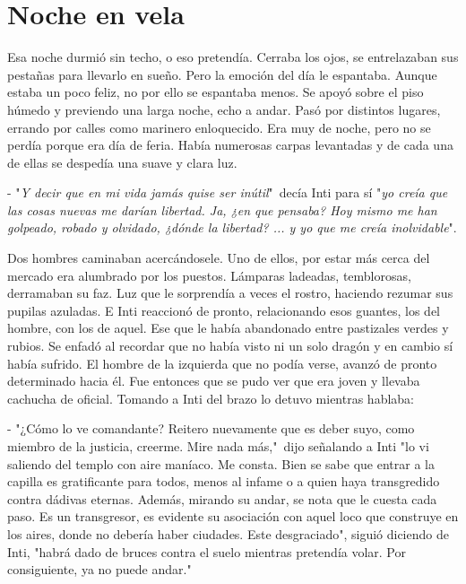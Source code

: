 
\chapter{Noche en vela}
Esa noche durmió sin techo, o eso pretendía. Cerraba los ojos, se entrelazaban sus pestañas para llevarlo en sueño. Pero la emoción del día le espantaba. Aunque estaba un poco feliz, no por ello se espantaba menos. Se apoyó sobre el piso húmedo y previendo una larga noche, echo a andar. Pasó por distintos lugares, errando por calles como marinero enloquecido. Era muy de noche, pero no se perdía porque era día de feria. Había numerosas carpas levantadas y de cada una de ellas se despedía una suave y clara luz.

- "\emph{Y decir que en mi vida jamás quise ser inútil}"\, decía Inti para sí "\emph{yo creía que las cosas nuevas me darían libertad. Ja, ¿en que pensaba? Hoy mismo me han golpeado, robado y olvidado, ¿dónde la libertad? ... y yo que me creía inolvidable}".

Dos hombres caminaban acercándosele. Uno de ellos, por estar más cerca del mercado era alumbrado por los puestos. Lámparas ladeadas, temblorosas, derramaban su faz. Luz que le sorprendía a veces el rostro, haciendo rezumar sus pupilas azuladas. E Inti reaccionó de pronto, relacionando esos guantes, los del hombre, con los de aquel. Ese que le había abandonado entre pastizales verdes y rubios. Se enfadó al recordar que no había visto ni un solo dragón y en cambio sí había sufrido. El hombre de la izquierda que no podía verse, avanzó de pronto determinado hacia él. Fue entonces que se pudo ver que era joven y llevaba cachucha de oficial. Tomando a Inti del brazo lo detuvo mientras hablaba:

- "¿Cómo lo ve comandante? Reitero nuevamente que es deber suyo, como miembro de la justicia, creerme. Mire nada más,"\, dijo señalando a Inti "lo vi saliendo del templo con aire maníaco. Me consta. Bien se sabe que entrar a la capilla es gratificante para todos, menos al infame o a quien haya transgredido contra dádivas eternas. Además, mirando su andar, se nota que le cuesta cada paso. Es un transgresor, es evidente su asociación con aquel loco que construye en los aires, donde no debería haber ciudades. Este desgraciado", siguió diciendo de Inti, "habrá dado de bruces contra el suelo mientras pretendía volar. Por consiguiente, ya no puede andar."

